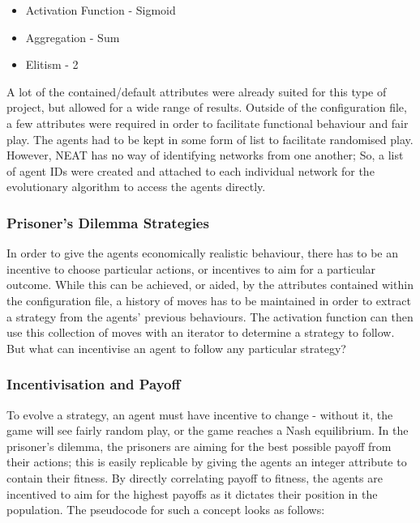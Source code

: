 \documentclass[12pt,a4paper]{article}
\begin{document}
\begin{itemize}
  \item Activation Function - Sigmoid
  \item Aggregation - Sum
  \item Elitism - 2 \\
\end{itemize}

A lot of the contained/default attributes were already suited for this type of project, but allowed for a wide range of results. Outside of the configuration file, a few attributes were required in order to facilitate functional behaviour and fair play. The agents had to be kept in some form of list to facilitate randomised play. However, NEAT has no way of identifying networks from one another; So, a list of agent IDs were created and attached to each individual network for the evolutionary algorithm to access the agents directly.

\subsubsection{Prisoner's Dilemma Strategies}
In order to give the agents economically realistic behaviour, there has to be an incentive to choose particular actions, or incentives to aim for a particular outcome. While this can be achieved, or aided, by the attributes contained within the configuration file, a history of moves has to be maintained in order to extract a strategy from the agents' previous behaviours. The activation function can then use this collection of moves with an iterator to determine a strategy to follow. But what can incentivise an agent to follow any particular strategy?

\subsubsection{Incentivisation and Payoff}
To evolve a strategy, an agent must have incentive to change - without it, the game will see fairly random play, or the game reaches a Nash equilibrium. In the prisoner's dilemma, the prisoners are aiming for the best possible payoff from their actions; this is easily replicable by giving the agents an integer attribute to contain their fitness. By directly correlating payoff to fitness, the agents are incentived to aim for the highest payoffs as it dictates their position in the population. The pseudocode for such a concept looks as follows:
\end{document}
